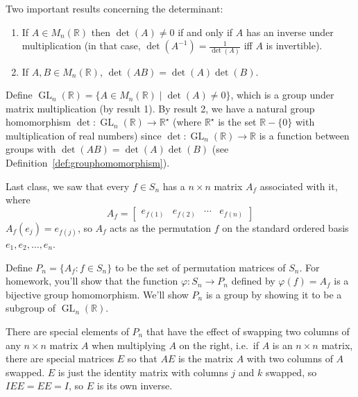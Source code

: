 \documentclass[12pt,letterpaper,DIV=11,final]{scrartcl}
\theoremstyle{plain}
\theoremstyle{definition}
\theoremstyle{remark}
\newtheorem*{comment}{Comment}
\DeclareMathOperator{\gl}{GL} %
\DeclareMathOperator{\col}{col}
\begin{document}
Two important results concerning the determinant:
\begin{enumerate}
  \item If $A \in M_n(\mathbb{R})$ then $\det(A) \neq 0$ if and only if $A$ has an inverse under multiplication
    (in that case, $\det(A^{-1}) = \frac{1}{\det(A)}$ iff $A$ is invertible).
  \item If $A, B \in M_n(\mathbb{R})$, $\det(AB) = \det(A) \det(B)$.
\end{enumerate}

Define $\gl_n(\mathbb{R}) = \{ A \in M_n(\mathbb{R}) \mid \det(A) \neq 0 \}$, which is a group under matrix multiplication (by result 1).
By result 2, we have a natural group homomorphism $\det : \gl_n(\mathbb{R}) \to \mathbb{R}^\star$
(where $\mathbb{R}^\star$ is the set $\mathbb{R} - \{ 0 \}$ with multiplication of real numbers)
since $\det : \gl_n(\mathbb{R}) \to \mathbb{R}$ is a function between groups with $\det(AB) = \det(A) \det(B)$ (see Definition~\ref{def:grouphomomorphism}).

Last class, we saw that every $f \in S_n$ has a $n \times n$ matrix $A_f$ associated with it, where
\begin{displaymath}
  A_f = \begin{bmatrix}
    e_{f(1)} & e_{f(2)} & \cdots & e_{f(n)}
  \end{bmatrix}
\end{displaymath}
$A_f(e_j) = e_{f(j)}$, so $A_f$ acts as the permutation $f$ on the standard ordered basis $e_1, e_2, \dots, e_n$.

\begin{comment}
  If $A \in M_n(\mathbb{R})$ and $e_j$ is the $j$\textsuperscript{th} standard ordered basis vector, then
  \begin{align*}
    A e_j &= 0 \col_A(1) + \cdots + \underbrace{1 \col_A(j)}_\text{1 in $j$\textsuperscript{th} position of $e_j$} + \cdots + 0 \col_A(n) \\
          &= \col_A(j)
  \end{align*}
\end{comment}

Define $P_n = \{ A_f : f \in S_n \}$ to be the set of permutation matrices of $S_n$.
For homework, you'll show that the function $\varphi : S_n \to P_n$ defined by $\varphi(f) = A_f$ is a bijective group homomorphism.
We'll show $P_n$ is a group by showing it to be a subgroup of $\gl_n(\mathbb{R})$.

There are special elements of $P_n$ that have the effect of swapping two columns of any $n \times n$ matrix $A$ when multiplying $A$ on the right,
i.e.\ if $A$ is an $n \times n$ matrix, there are special matrices $E$ so that $AE$ is the matrix $A$ with two columns of $A$ swapped.
$E$ is just the identity matrix with columns $j$ and $k$ swapped, so $IEE = EE = I$, so $E$ is its own inverse.
\end{document}
